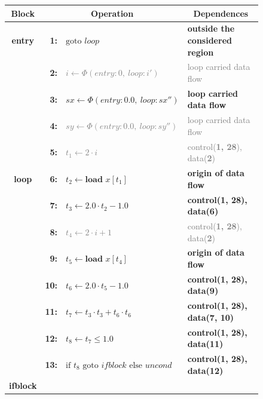 \begin{figure}[p]
\centering
\begin{tabular}{|c|rl|l|}
\hline
\multicolumn{1}{|c}{\bf Block} &  \multicolumn{2}{|c|}{\bf Operation} & \multicolumn{1}{c|}{\bf Dependences} \\
\hline
\hline
\multirow{1}{*}{\bf entry}
  & {\bf 1:} & \textcolor{color_strings}{$\text{goto }loop$}&\textcolor{color_strings}{\bf outside the considered region}\\
\hline
\multirow{9}{*}{\bf loop\vspace{4.5mm}}
  & {\bf  2:} & \textcolor{gray}{$i\leftarrow \Phi(entry:0,\ loop:i')$}&\textcolor{gray}{loop carried data flow}\\[-1.7mm]
  & {\bf  3:} & \textcolor{color_types}{$sx\leftarrow \Phi(entry:0.0,\ loop:sx'')$}&\textcolor{color_types}{\bf loop carried data flow}\\[-1.7mm]
  & {\bf  4:} & \textcolor{gray}{$sy\leftarrow \Phi(entry:0.0,\ loop:sy'')$}&\textcolor{gray}{loop carried data flow}\\[-1.7mm]
  & {\bf  5:} & \textcolor{gray}{$t_1\leftarrow 2\cdot i$}&\textcolor{gray}{control({\bf 1, 28}), data({\bf 2})}\\[-1.7mm]
  & {\bf  6:} & \textcolor{color_types}{$t_2\leftarrow\textbf{load }x[t_1]$}&\textcolor{color_types}{\bf origin of data flow}\\[-1.7mm]
  & {\bf  7:} & $t_3\leftarrow 2.0\cdot t_2-1.0$&{\bf control({\bf 1, 28}), data({\bf 6})}\\[-1.7mm]
  & {\bf  8:} & \textcolor{gray}{$t_4\leftarrow 2\cdot i+1$}&\textcolor{gray}{control({\bf 1, 28}), data({\bf 2})}\\[-1.7mm]
  & {\bf  9:} & \textcolor{color_types}{$t_5\leftarrow\textbf{load }x[t_4]$}&\textcolor{color_types}{\bf origin of data flow}\\[-1.7mm]
  & {\bf 10:} & $t_6\leftarrow 2.0\cdot t_5-1.0$&{\bf control({\bf 1, 28}), data({\bf 9})}\\[-1.7mm]
  & {\bf 11:} & $t_7\leftarrow t_3\cdot t_3+t_6\cdot t_6$&{\bf control({\bf 1, 28}), data({\bf 7, 10})}\\[-1.7mm]
  & {\bf 12:} & $t_8\leftarrow t_7\leq1.0$&{\bf control({\bf 1, 28}), data({\bf 11})}\\[-1.7mm]
  & {\bf 13:} & $\text{if }t_8\text{ goto }ifblock\text{ else }uncond$&{\bf control({\bf 1, 28}), data({\bf 12})}\\
\hline
\multirow{8}{*}{\bf ifblock\vspace{3mm}}

\end{tabular}
\end{figure}
